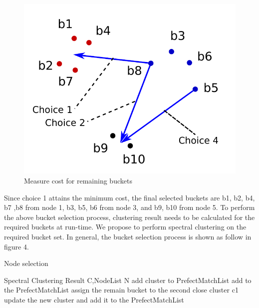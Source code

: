 \documentclass{vldb}
\begin{document}
\begin{figure}
\centering
\includegraphics[scale=0.5]{fig3}
\caption{Measure cost for remaining buckets}
\label{fig:fig3}
\end{figure}

Since choice 1 attains the minimum cost, the final selected buckets are b1, b2, b4, b7 ,b8 from node 1, b3, b5, b6 from node 3, and b9, b10 from node 5.
	To perform the above bucket selection process, clustering result needs to be calculated for the required buckets at run-time. We propose to perform spectral clustering on the required bucket set. In general, the bucket selection process is shown as follow in figure 4.
	
\begin{algorithm}
\caption{Node selection}
\label{alg:A}
\begin{algorithmic}[1]
\REQUIRE Spectral Clustering Result C,NodeList N
\STATE add cluster to PrefectMatchList
\ELSE
{}
\STATE add to the PrefectMatchList
\STATE assign the remain bucket to the second close cluster c1 
\STATE update the new cluster and add it to the PrefectMatchList
\ENDIF
\ENDIF
\ENDFOR
\ENDFOR
{}
\end{algorithmic}
\end{algorithm}
\end{document}
